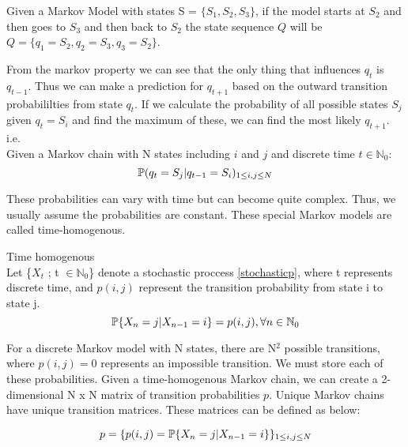 \begin{example}
	\label{stateseq}
	Given a Markov Model with states S = $\{S_1,S_2,S_3\}$, if the model starts at $S_2$ and then goes to $S_3$ and then back to $S_2$
	the state sequence $Q$ will be $Q = \{q_1 = S_2, q_2 = S_3, q_3 = S_2\}$.
\end{example}

From the markov property we can see that the only thing that influences $q_t$ is $q_{t-1}$. Thus we can make a prediction for $q_{t+1}$
based on the outward transition probabililties from state $q_t$. If we calculate the probability of all possible states $S_j$
given $q_t = S_i$ and find the maximum of these,  we can find the most likely $q_{t+1}$.
\\
i.e. 
\\
Given a Markov chain with N states including $i$ and $j$ and discrete time $t \in \mathbb{N}_0$:
\begin{equation}
	\mathbb{P} (q_t = S_j | q_{t-1} = S_i)_{1 \leq i,j \leq N}
\end{equation}


These probabilities can vary with time but can become quite complex. Thus, we usually assume the probabilities are constant. 
These special Markov models are called time-homogenous. 

\begin{definition}
\label{timehomogenous}
	Time homogenous \\
	Let \{$X_t$ ; t $\in \mathbb{N}_0$\} denote a stochastic proccess \ref{stochasticp}, where t represents discrete time, and $p(i,j)$ represent the transition probability from state i to state j. 
	\begin{equation}
		\mathbb{P} \{X_n = j | X_{n-1} = i\} = p(i,j),       \forall n \in \mathbb{N}_0
	\end{equation}
\end{definition}

For a discrete Markov model with N states, there are N$^2$ possible transitions, where $p(i,j) = 0$ represents an impossible transition.
We must store each of these probabilities. Given a time-homogenous Markov chain, we can create a 2-dimensional N x N matrix of transition probabilities $p$.
Unique Markov chains have unique transition matrices. These matrices can be defined as below:

\begin{equation}
	p = \{ p(i,j) = \mathbb{P} \{ X_n = j | X_{n-1} = i \}\}_{1 \leq i,j \leq N}
\end{equation}

